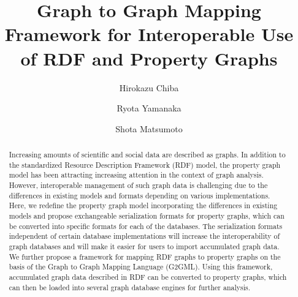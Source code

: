 \documentclass[runningheads]{llncs}
\begin{document}
\newtheorem{defi}[theorem]{Definition}
%
\title{Graph to Graph Mapping Framework for Interoperable Use of RDF and Property Graphs}
%
%
\author{Hirokazu Chiba \and Ryota Yamanaka \and Shota Matsumoto}
%
%
%
\maketitle              %
%
\begin{abstract}
Increasing amounts of scientific and social data are described as graphs. In addition to the standardized Resource Description Framework (RDF) model, the property graph model has been attracting increasing attention in the context of graph analysis. 
However, interoperable management of such graph data is challenging due to the differences in existing models and formats depending on various implementations. Here, we redefine the property graph model incorporating the differences in existing models and propose exchangeable serialization formats for property graphs, which can be converted into specific formats for each of the databases. 
The serialization formats independent of certain database implementations will increase the interoperability of graph databases and will make it easier for users to import accumulated graph data.
We further propose a framework for mapping RDF graphs to property graphs on the basis of the Graph to Graph Mapping Language (G2GML). Using this framework, accumulated graph data described in RDF can be converted to property graphs, which can then be loaded into several graph database engines for further analysis. 

\end{abstract}
\end{document}
